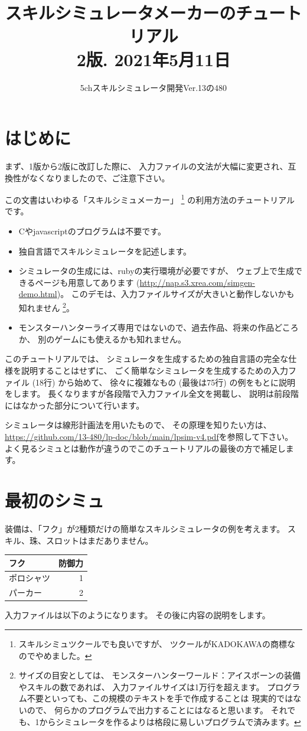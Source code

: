 \documentclass[dvipdfmx]{jsarticle}
\title{スキルシミュレータメーカーのチュートリアル
\\
{\small 2版. 2021年5月11日}
}
\date{}
\author{5chスキルシミュレータ開発Ver.13の480}
\begin{document}
\maketitle
\tableofcontents

\section{はじめに} %
まず、1版から2版に改訂した際に、
入力ファイルの文法が大幅に変更され、互換性がなくなりましたので、ご注意下さい。

この文書はいわゆる「スキルシミュメーカー」%
\footnote{スキルシミュツクールでも良いですが、
ツクールがKADOKAWAの商標なのでやめました。}%
の利用方法のチュートリアルです。

\begin{itemize}
\item 
Cやjavascriptのプログラムは不要です。
\item 
独自言語でスキルシミュレータを記述します。
\item 
シミュレータの生成には、rubyの実行環境が必要ですが、
ウェブ上で生成できるページも用意してあります
(\url{http://nap.s3.xrea.com/simgen-demo.html})。
このデモは、入力ファイルサイズが大きいと動作しないかも知れません%
\footnote{%
サイズの目安としては、
モンスターハンターワールド：アイスボーンの装備やスキルの数であれば、
入力ファイルサイズは1万行を超えます。
プログラム不要といっても、この規模のテキストを手で作成することは
現実的ではないので、
何らかのプログラムで出力することにはなると思います。
それでも、1からシミュレータを作るよりは格段に易しいプログラムで済みます。
}。
\item 
モンスターハンターライズ専用ではないので、過去作品、将来の作品どころか、
別のゲームにも使えるかも知れません。
\end{itemize}

このチュートリアルでは、
シミュレータを生成するための独自言語の完全な仕様を説明することはせずに、
ごく簡単なシミュレータを生成するための入力ファイル (18行) から始めて、
徐々に複雑なもの (最後は75行) の例をもとに説明をします。
長くなりますが各段階で入力ファイル全文を掲載し、
説明は前段階にはなかった部分について行います。

シミュレータは線形計画法を用いたもので、
その原理を知りたい方は、
\url{https://github.com/13-480/lp-doc/blob/main/lpsim-v4.pdf}を参照して下さい。
よく見るシミュとは動作が違うのでこのチュートリアルの最後の方で補足します。

\section{最初のシミュ} %
装備は、「フク」が2種類だけの簡単なスキルシミュレータの例を考えます。
スキル、珠、スロットはまだありません。
%
\begin{center}
\begin{tabular}{lr}
\toprule
フク       & 防御力 \\
\midrule
ポロシャツ & 1 \\
パーカー   & 2 \\
\bottomrule
\end{tabular}
\end{center}
%
入力ファイルは以下のようになります。
その後に内容の説明をします。
\medskip
\end{document}
